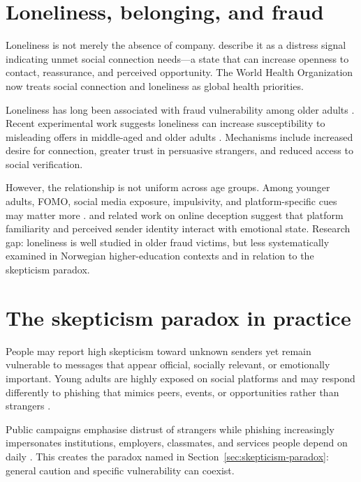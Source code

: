 \documentclass[UKenglish,12pt]{master-style}
\begin{document}
\section{Loneliness, belonging, and fraud}

Loneliness is not merely the absence of company. \textcite{cacioppo2008loneliness} describe it as a distress signal indicating unmet social connection needs---a state that can increase openness to contact, reassurance, and perceived opportunity. The World Health Organization \parencite{ons2023loneliness} now treats social connection and loneliness as global health priorities.

Loneliness has long been associated with fraud vulnerability among older adults \parencite{alves2008loneliness,wen2022mechanisms}. Recent experimental work suggests loneliness can increase susceptibility to misleading offers in middle-aged and older adults \parencite{wen2024loneliness}. Mechanisms include increased desire for connection, greater trust in persuasive strangers, and reduced access to social verification.

However, the relationship is not uniform across age groups. Among younger adults, FOMO, social media exposure, impulsivity, and platform-specific cues may matter more \parencite{przybylski2013fomo,kluetsch2024friend}. \textcite{popovac2020online} and related work on online deception suggest that platform familiarity and perceived sender identity interact with emotional state. Research gap: loneliness is well studied in older fraud victims, but less systematically examined in Norwegian higher-education contexts and in relation to the skepticism paradox.

\section{The skepticism paradox in practice}

People may report high skepticism toward unknown senders yet remain vulnerable to messages that appear official, socially relevant, or emotionally important. Young adults are highly exposed on social platforms and may respond differently to phishing that mimics peers, events, or opportunities rather than strangers \parencite{kluetsch2024friend,parker2020contributing}.

Public campaigns emphasise distrust of strangers while phishing increasingly impersonates institutions, employers, classmates, and services people depend on daily \parencite{finansnorge2026svindel,nettvettPhishing}. This creates the paradox named in Section~\ref{sec:skepticism-paradox}: general caution and specific vulnerability can coexist.
\end{document}
